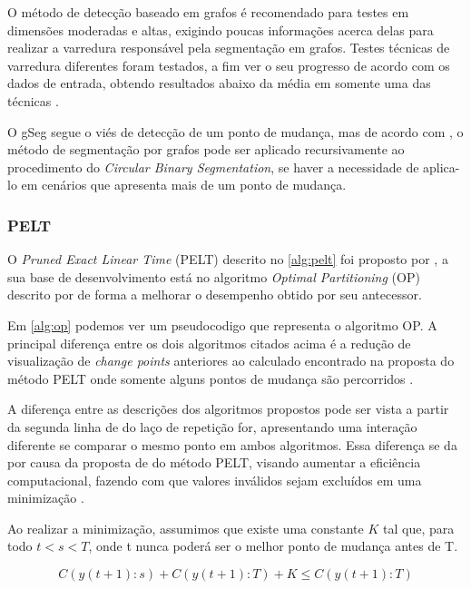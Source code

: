 O método de detecção baseado em grafos é recomendado para testes em dimensões moderadas e altas, exigindo poucas informações acerca delas para realizar a varredura responsável pela segmentação em grafos. Testes técnicas de varredura diferentes foram testados, a fim ver o seu progresso de acordo com os dados de entrada, obtendo resultados abaixo da média em somente uma das técnicas \cite{Chen2015}. 

O gSeg segue o viés de detecção de um ponto de mudança, mas de acordo com \cite{Chen2015}, o método de segmentação por grafos pode ser aplicado recursivamente ao procedimento do \textit{Circular Binary Segmentation}, se haver a necessidade de aplica-lo em cenários que apresenta mais de um ponto de mudança.


\subsubsection{PELT}

O \textit{Pruned Exact Linear Time} (PELT) descrito no \autoref{alg:pelt} foi proposto por \cite{Killick2012}, a sua base de desenvolvimento está no algoritmo \textit{Optimal Partitioning} (OP) descrito por \cite{Gioumousis2005} de forma a melhorar o desempenho obtido por seu antecessor. 

Em \autoref{alg:op} podemos ver um pseudocodigo que representa o algoritmo OP. A principal diferença entre os dois algoritmos citados acima é a redução de visualização de \textit{change points} anteriores ao calculado encontrado na proposta do método PELT onde somente alguns pontos de mudança são percorridos \cite{BenedicteBakka2018}.

A diferença entre as descrições dos algoritmos propostos pode ser vista a partir da segunda linha de do laço de repetição for, apresentando uma interação diferente se comparar o mesmo ponto em ambos algoritmos. Essa diferença se da por causa da proposta de do método PELT, visando aumentar a eficiência computacional, fazendo com que valores inválidos sejam excluídos em uma minimização \cite{Killick2012}. 

Ao realizar a minimização, assumimos que existe uma constante $K$ tal que, para todo $t < s < T$, onde t nunca poderá ser o melhor ponto de mudança antes de T. 

\begin{equation}
    C\left ( y\left ( t+1 \right ):s \right ) + C\left ( y\left ( t+1 \right ):T \right ) + K \leq C\left ( y\left ( t+1 \right ):T \right )
    \label{eq:calculo-pelt}
\end{equation}


